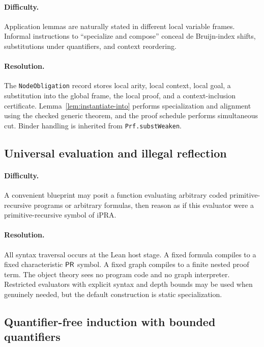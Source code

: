\paragraph{Difficulty.}
Application lemmas are naturally stated in different local variable frames.  Informal instructions to
``specialize and compose'' conceal de Bruijn-index shifts, substitutions under quantifiers, and context
reordering.

\paragraph{Resolution.}
The \texttt{NodeObligation} record stores local arity, local context, local goal, a substitution into the
global frame, the local proof, and a context-inclusion certificate.  Lemma~\ref{lem:instantiate-into}
performs specialization and alignment using the checked generic theorem, and the proof schedule performs
simultaneous cut.  Binder handling is inherited from \texttt{Prf.substWeaken}.

\subsection{Universal evaluation and illegal reflection}

\paragraph{Difficulty.}
A convenient blueprint may posit a function evaluating arbitrary coded primitive-recursive programs or
arbitrary formulas, then reason as if this evaluator were a primitive-recursive symbol of iPRA.

\paragraph{Resolution.}
All syntax traversal occurs at the Lean host stage.  A fixed formula compiles to a fixed characteristic
\(\mathsf{PR}\) symbol.  A fixed graph compiles to a finite nested proof term.  The object theory sees no program
code and no graph interpreter.  Restricted evaluators with explicit syntax and depth bounds may be used
when genuinely needed, but the default construction is static specialization.

\subsection{Quantifier-free induction with bounded quantifiers}

